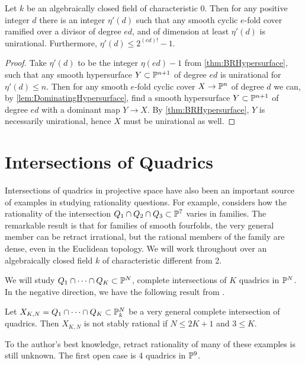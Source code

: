 	\begin{theorem}
          \label{thm:SmoothDoubleCoverUnirationality}
		Let $k$ be an algebraically closed field of characteristic 0. Then for any positive integer $d$ there is an integer $\eta'(d)$ such that any smooth cyclic $e$-fold cover ramified over a divisor of degree $ed$, and of dimension at least $\eta'(d)$ is unirational. Furthermore, $\eta'(d) \leq 2^{(ed)!}-1$.
	\end{theorem}
	\begin{proof}
		Take $\eta'(d)$ to be the integer $\eta(ed)-1$ from \cref{thm:BRHypersurface}, such that any smooth hypersurface $Y \subset \P^{n+1}$ of degree $ed$ is unirational for $\eta'(d) \leq n$. Then for any smooth $e$-fold cyclic cover $X \to \P^n$ of degree $d$ we can, by \cref{lem:DominatingHypersurface}, find a smooth hypersurface $Y \subset \P^{n+1}$ of degree $ed$ with a dominant map $Y \to X$. By \cref{thm:BRHypersurface}, $Y$ is necessarily unirational, hence $X$ must be unirational as well.
	\end{proof}

\section{Intersections of Quadrics}
Intersections of quadrics in projective space have also been an important source of examples in studying rationality questions. For example, \cite{HPTThreeQuadrics} considers how the rationality of the intersection $Q_1 \cap Q_2 \cap Q_3 \subset \P^7$ varies in families. The remarkable result is that for families of smooth fourfolds, the very general member can be retract irrational, but the rational members of the family are dense, even in the Euclidean topology. We will work throughout over an algebraically closed field $k$ of characteristic different from 2.

We will study $Q_1 \cap \cdots \cap Q_K \subset \P^N$, complete intersections of $K$ quadrics in $\P^N$. In the negative direction, we have the following result from \cite[Theorem 7.8]{NicaiseOttem}.
\begin{theorem}
	\label{thm:QuadricsIrrationality}
  Let $X_{K,N} = Q_1 \cap \cdots \cap Q_K \subset \P_k^N$ be a very general complete intersection of quadrics. Then $X_{K,N}$ is not stably rational if $N \leq 2K+1$ and $3 \leq K$.
\end{theorem}
\begin{remark}
  To the author's best knowledge, retract rationality of many of these examples is still unknown. The first open case is 4 quadrics in $\P^9$.
\end{remark}

